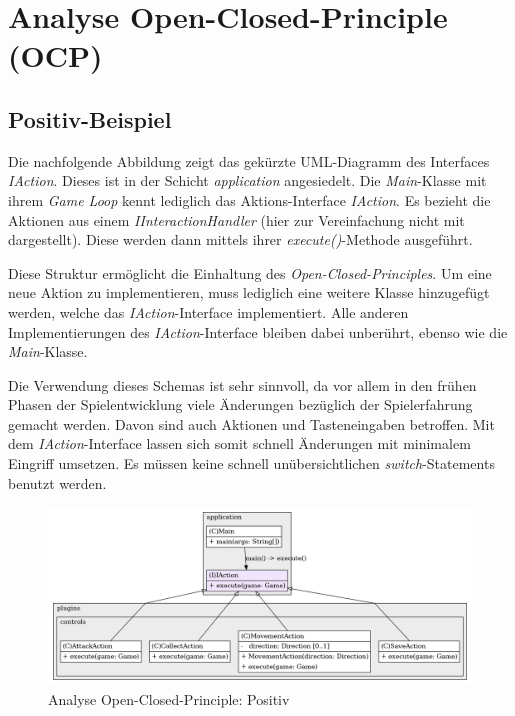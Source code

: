\section{Analyse Open-Closed-Principle (OCP)}
\subsection{Positiv-Beispiel}
Die nachfolgende Abbildung zeigt das gekürzte UML-Diagramm des Interfaces
\textit{IAction}. Dieses ist in der Schicht \textit{application}
angesiedelt. Die \textit{Main}-Klasse mit ihrem \textit{Game Loop}
kennt lediglich das Aktions-Interface \textit{IAction}. Es bezieht
die Aktionen aus einem \textit{IInteractionHandler} (hier zur
Vereinfachung nicht mit dargestellt). Diese werden dann mittels
ihrer \textit{execute()}-Methode ausgeführt. 

Diese Struktur ermöglicht die Einhaltung des
\textit{Open-Closed-Principles}. Um eine neue Aktion zu implementieren,
muss lediglich eine weitere Klasse hinzugefügt werden, welche das 
\textit{IAction}-Interface implementiert. Alle anderen Implementierungen
des \textit{IAction}-Interface bleiben dabei unberührt, ebenso wie die
\textit{Main}-Klasse.

Die Verwendung dieses Schemas ist sehr sinnvoll, da vor allem in den
frühen Phasen der Spielentwicklung viele Änderungen bezüglich der
Spielerfahrung gemacht werden. Davon sind auch Aktionen und
Tasteneingaben betroffen. Mit dem \textit{IAction}-Interface lassen
sich somit schnell Änderungen mit minimalem Eingriff umsetzen. Es
müssen keine schnell unübersichtlichen \textit{switch}-Statements
benutzt werden. 

\vspace{0.2cm}
\begin{figure}[H]
    \centering
    \includegraphics[width=1\linewidth]{Bilder/Visualisierung/IAction_structure.png}
    \caption{Analyse Open-Closed-Principle: Positiv}
\end{figure}

